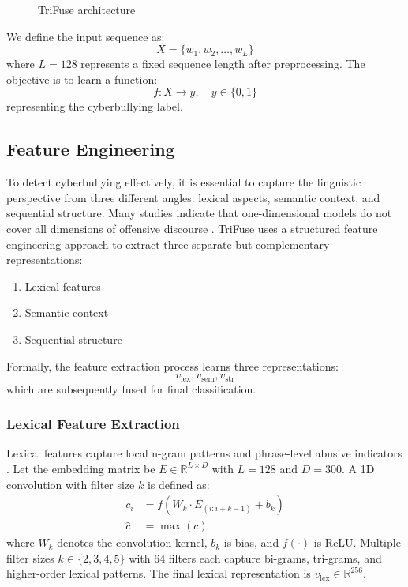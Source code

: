 \begin{figure}[!t]
\centering

\caption{TriFuse architecture}
\label{fig:architecture}
\end{figure}

We define the input sequence as:
\[
X = \{ w_1, w_2, \ldots, w_L \}
\]
where $L = 128$ represents a fixed sequence length after preprocessing. The objective is to learn a function:
\begin{equation}
f: X \rightarrow y, \quad y \in \{0,1\}
\end{equation}
representing the cyberbullying label.

\subsection{Feature Engineering}

To detect cyberbullying effectively, it is essential to capture the linguistic perspective from three different angles: lexical aspects, semantic context, and sequential structure. Many studies indicate that one-dimensional models do not cover all dimensions of offensive discourse \cite{ref2, ref12, ref14}. TriFuse uses a structured feature engineering approach to extract three separate but complementary representations:
\begin{enumerate}
\item Lexical features
\item Semantic context
\item Sequential structure
\end{enumerate}

Formally, the feature extraction process learns three representations:
\[
v_{\mathrm{lex}}, v_{\mathrm{sem}}, v_{\mathrm{str}}
\]
which are subsequently fused for final classification.

\subsubsection{Lexical Feature Extraction}

Lexical features capture local n-gram patterns and phrase-level abusive indicators \cite{ref7}. Let the embedding matrix be $E \in \mathbb{R}^{L \times D}$ with $L=128$ and $D=300$. A 1D convolution with filter size $k$ is defined as:
\begin{equation}
\begin{aligned}
c_i &= f(W_k \cdot E_{(i:i + k - 1)} + b_k) \\
\hat{c} &= \max(c)
\end{aligned}
\end{equation}
where $W_k$ denotes the convolution kernel, $b_k$ is bias, and $f(\cdot)$ is ReLU. Multiple filter sizes $k \in \{2,3,4,5\}$ with 64 filters each capture bi-grams, tri-grams, and higher-order lexical patterns. The final lexical representation is $v_{\mathrm{lex}} \in \mathbb{R}^{256}$.

